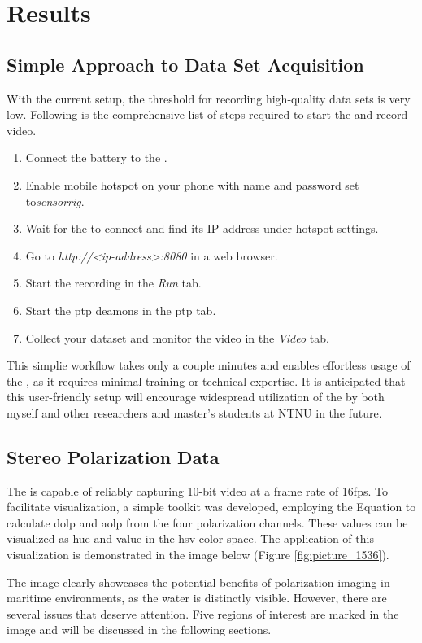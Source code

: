 \chapter{Results}
\label{chap:results}

\section{Simple Approach to Data Set Acquisition}
With the current setup, the threshold for recording high-quality data sets is very low.
Following is the comprehensive list of steps required to start the \sr and record video.
\begin{enumerate}
    \item Connect the battery to the \jx.
    \item Enable mobile hotspot on your phone with name and password set to\textit{sensorrig}.
    \item Wait for the \sr to connect and find its IP address under hotspot settings.
    \item Go to \textit{http://<ip-address>:8080} in a web browser.
    \item Start the recording in the \textit{Run} tab.
    \item Start the \gls{ptp} deamons in the \gls{ptp} tab.
    \item Collect your dataset and monitor the video in the \textit{Video} tab.
\end{enumerate}
This simplie workflow takes only a couple minutes and enables effortless usage of the \sr, as it requires minimal training or technical expertise.
It is anticipated that this user-friendly setup will encourage widespread utilization of the \sr by both myself and other researchers and master's students at NTNU in the future.



\section{Stereo Polarization Data}
The \sr is capable of reliably capturing 10-bit video at a frame rate of 16fps.
To facilitate visualization, a simple toolkit was developed, employing the Equation \todo to calculate \gls{dolp} and \gls{aolp} from the four polarization channels.
These values can be visualized as hue and value in the \gls{hsv} color space.
The application of this visualization is demonstrated in the image below (Figure \ref{fig:picture_1536}).

The image clearly showcases the potential benefits of polarization imaging in maritime environments, as the water is distinctly visible.
However, there are several issues that deserve attention.
Five regions of interest are marked in the image and will be discussed in the following sections.


